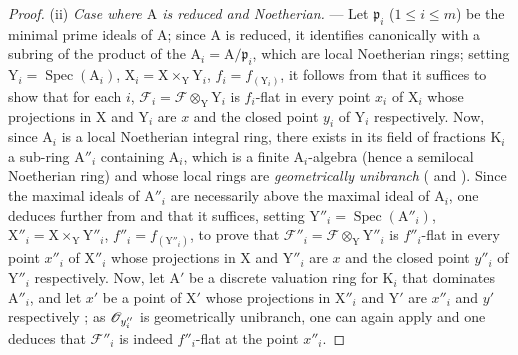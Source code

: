 \begin{proof}
(ii) \emph{Case where $\mathrm{A}$ is reduced and Noetherian.} --- Let $\mathfrak{p}_i$ ($1\leq i\leq m$) be the minimal prime ideals of $\mathrm{A}$; since $\mathrm{A}$ is reduced, it identifies canonically with a subring of the product of the $\mathrm{A}_i=\mathrm{A}/\mathfrak{p}_i$, which are local Noetherian rings; setting $\mathrm{Y}_i=\operatorname{Spec}(\mathrm{A}_i)$, $\mathrm{X}_i=\mathrm{X}\times_\mathrm{Y}\mathrm{Y}_i$, $f_i=f_{(\mathrm{Y}_i)}$, it follows from  that it suffices to show that for each $i$, $\mathscr{F}_i=\mathscr{F}\otimes_\mathrm{Y}\mathrm{Y}_i$ is $f_i$-flat in every point $x_i$ of $\mathrm{X}_i$ whose projections in $\mathrm{X}$ and $\mathrm{Y}_i$ are $x$ and the closed point $y_i$ of $\mathrm{Y}_i$ respectively.
Now, since $\mathrm{A}_i$ is a local Noetherian integral ring, there exists in its field of fractions $\mathrm{K}_i$ a sub-ring $\mathrm{A}''_i$ containing $\mathrm{A}_i$, which is a finite $\mathrm{A}_i$-algebra (hence a semilocal Noetherian ring) and whose local rings are \emph{geometrically unibranch} ( and ).
Since the maximal ideals of $\mathrm{A}''_i$ are necessarily above the maximal ideal of $\mathrm{A}_i$, one deduces further from  and  that it suffices, setting $\mathrm{Y}''_i=\operatorname{Spec}(\mathrm{A}''_i)$, $\mathrm{X}''_i=\mathrm{X}\times_\mathrm{Y}\mathrm{Y}''_i$, $f''_i=f_{(\mathrm{Y}''_i)}$, to prove that $\mathscr{F}''_i=\mathscr{F}\otimes_\mathrm{Y}\mathrm{Y}''_i$ is $f''_i$-flat in every point $x''_i$ of $\mathrm{X}''_i$ whose projections in $\mathrm{X}$ and $\mathrm{Y}''_i$ are $x$ and the closed point $y''_i$ of $\mathrm{Y}''_i$ respectively.
Now, let $\mathrm{A}'$ be a discrete valuation ring for $\mathrm{K}_i$ that dominates $\mathrm{A}''_i$, and let $x'$ be a point of $\mathrm{X}'$ whose projections in $\mathrm{X}''_i$ and $\mathrm{Y}'$ are $x''_i$ and $y'$ respectively ; as $\mathscr{O}_{y''_i}$ is geometrically unibranch, one can again apply  and one deduces that $\mathscr{F}''_i$ is indeed $f''_i$-flat at the point $x''_i$.
\end{proof}

